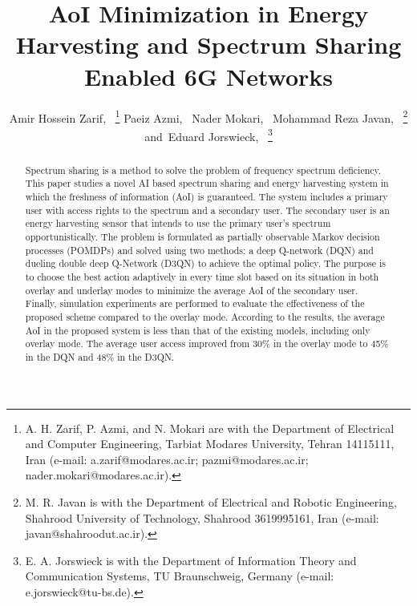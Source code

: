 \documentclass[journal]{IEEEtran}
\begin{document}
\title{AoI Minimization in Energy Harvesting and Spectrum Sharing Enabled 6G Networks}

\author{Amir Hossein Zarif,~
		\thanks{A. H. Zarif, P. Azmi, and N. Mokari are with the Department of Electrical and Computer Engineering, Tarbiat Modares University, Tehran 14115111, Iran (e-mail: a.zarif@modares.ac.ir; pazmi@modares.ac.ir; nader.mokari@modares.ac.ir).}%
        Paeiz Azmi,~
        Nader Mokari,~
        Mohammad Reza Javan,~
        \thanks{M. R. Javan is with the Department of Electrical and Robotic Engineering, Shahrood University of Technology, Shahrood 3619995161, Iran (e-mail: javan@shahroodut.ac.ir).}%
        and~Eduard Jorswieck,~
        \thanks{E. A. Jorswieck is with the Department of Information Theory and Communication Systems, TU Braunschweig, Germany (e-mail: e.jorswieck@tu-bs.de).}%
    }



\maketitle

	\begin{abstract}
		Spectrum sharing is a method to solve the problem of frequency spectrum deficiency. This paper studies a novel AI based spectrum sharing and energy harvesting system in which the freshness of information (AoI) is guaranteed. The system includes a primary user with access rights to the spectrum and a secondary user. The secondary user is an energy harvesting sensor that intends to use the primary user’s spectrum opportunistically. The problem is formulated as partially observable Markov decision processes (POMDPs) and solved using two methods: a deep Q-network (DQN) and dueling double deep Q-Network (D3QN) to achieve the optimal policy. The purpose is to choose the best action adaptively in every time slot based on its situation in both overlay and underlay modes to minimize the average AoI of the secondary user. Finally, simulation experiments are performed to evaluate the effectiveness of the proposed scheme compared to the overlay mode. According to the results, the average AoI in the proposed system is less than that of the existing models, including only overlay mode. The average user access improved from 30\% in the overlay mode to 45\% in the DQN and 48\% in the D3QN.
	\end{abstract}
\end{document}
